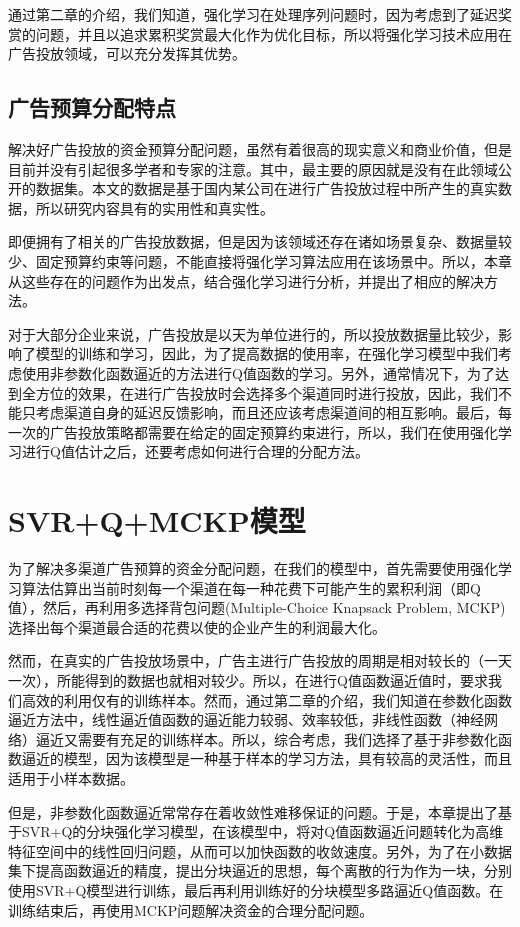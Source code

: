 通过第二章的介绍，我们知道，强化学习在处理序列问题时，因为考虑到了延迟奖赏的问题，并且以追求累积奖赏最大化作为优化目标，所以将强化学习技术应用在广告投放领域，可以充分发挥其优势。

\subsection{广告预算分配特点}
解决好广告投放的资金预算分配问题，虽然有着很高的现实意义和商业价值，但是目前并没有引起很多学者和专家的注意。其中，最主要的原因就是没有在此领域公开的数据集。本文的数据是基于国内某公司在进行广告投放过程中所产生的真实数据，所以研究内容具有的实用性和真实性。

即便拥有了相关的广告投放数据，但是因为该领域还存在诸如场景复杂、数据量较少、固定预算约束等问题，不能直接将强化学习算法应用在该场景中。所以，本章从这些存在的问题作为出发点，结合强化学习进行分析，并提出了相应的解决方法。

对于大部分企业来说，广告投放是以天为单位进行的，所以投放数据量比较少，影响了模型的训练和学习，因此，为了提高数据的使用率，在强化学习模型中我们考虑使用非参数化函数逼近的方法进行Q值函数的学习。另外，通常情况下，为了达到全方位的效果，在进行广告投放时会选择多个渠道同时进行投放，因此，我们不能只考虑渠道自身的延迟反馈影响，而且还应该考虑渠道间的相互影响。最后，每一次的广告投放策略都需要在给定的固定预算约束进行，所以，我们在使用强化学习进行Q值估计之后，还要考虑如何进行合理的分配方法。

\section{SVR+Q+MCKP模型}
为了解决多渠道广告预算的资金分配问题，在我们的模型中，首先需要使用强化学习算法估算出当前时刻每一个渠道在每一种花费下可能产生的累积利润（即Q值），然后，再利用多选择背包问题(Multiple-Choice Knapsack Problem, MCKP)选择出每个渠道最合适的花费以使的企业产生的利润最大化。

然而，在真实的广告投放场景中，广告主进行广告投放的周期是相对较长的（一天一次），所能得到的数据也就相对较少。所以，在进行Q值函数逼近值时，要求我们高效的利用仅有的训练样本。然而，通过第二章的介绍，我们知道在参数化函数逼近方法中，线性逼近值函数的逼近能力较弱、效率较低，非线性函数（神经网络）逼近又需要有充足的训练样本。所以，综合考虑，我们选择了基于非参数化函数逼近的模型，因为该模型是一种基于样本的学习方法，具有较高的灵活性，而且适用于小样本数据。

但是，非参数化函数逼近常常存在着收敛性难移保证的问题。于是，本章提出了基于SVR+Q的分块强化学习模型，在该模型中，将对Q值函数逼近问题转化为高维特征空间中的线性回归问题，从而可以加快函数的收敛速度。另外，为了在小数据集下提高函数逼近的精度，提出分块逼近的思想，每个离散的行为作为一块，分别使用SVR+Q模型进行训练，最后再利用训练好的分块模型多路逼近Q值函数。在训练结束后，再使用MCKP问题解决资金的合理分配问题。

